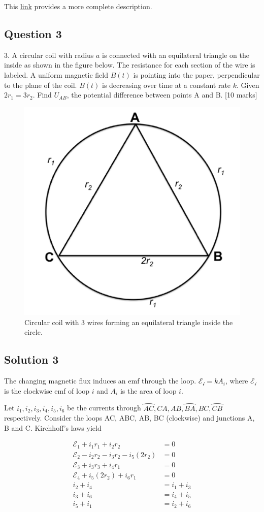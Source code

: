 \documentclass{article}
\begin{document}
This \href{https://mitocw.ups.edu.ec/courses/physics/8-012-physics-i-classical-mechanics-fall-2008/related-resources/2007_quiz2_sol.pdf}{link} provides a more complete description.

\pagebreak

\subsection{Question 3}
3. A circular coil with radius $a$ is connected with an equilateral triangle on the inside as shown in the figure below. The resistance for each section of the wire is labeled. A uniform magnetic field $B(t)$ is pointing into the paper, perpendicular to the plane of the coil. $B(t)$ is decreasing over time at a constant rate $k .$ Given $2 r_{1}=3 r_{2} .$ Find $U_{A B}$, the potential difference between points $\mathrm{A}$ and $\mathrm{B}$. [10 marks]
\begin{figure}
	\centering
	\includegraphics[width=0.5\linewidth]{spho_book_TYS_images/2016q3.png}
	\caption{Circular coil with 3 wires forming an equilateral triangle inside the circle.}
\end{figure}

\subsection{Solution 3}
The changing magnetic flux induces an emf through the loop. $\mathcal{E_i} = kA_i$, where $\mathcal{E_i}$ is the clockwise emf of loop $i$ and $A_i$ is the area of loop $i$.

Let $i_1, i_2, i_3, i_4, i_5, i_6$ be the currents through $\wideparen{AC}, CA, AB, \wideparen{BA}, BC, \wideparen{CB}$ respectively. Consider the loops AC, ABC, AB, BC (clockwise) and junctions A, B and C. Kirchhoff's laws yield

\begin{align}
\mathcal{E}_1 + i_1r_1+i_2r_2 &= 0 \\
\mathcal{E}_2 - i_2r_2 - i_3r_2 - i_5(2r_2)& = 0 \\
\mathcal{E}_3 +i_3r_3+i_4r_1 &= 0\\
\mathcal{E}_4 + i_5(2r_2)+i_6r_1 &= 0 \\
i_2+i_4 &= i_1+i_3 \\
i_3 + i_6 &= i_4+i_5 \\
i_5 + i_1 &= i_2 + i_6
\end{align}
\end{document}
